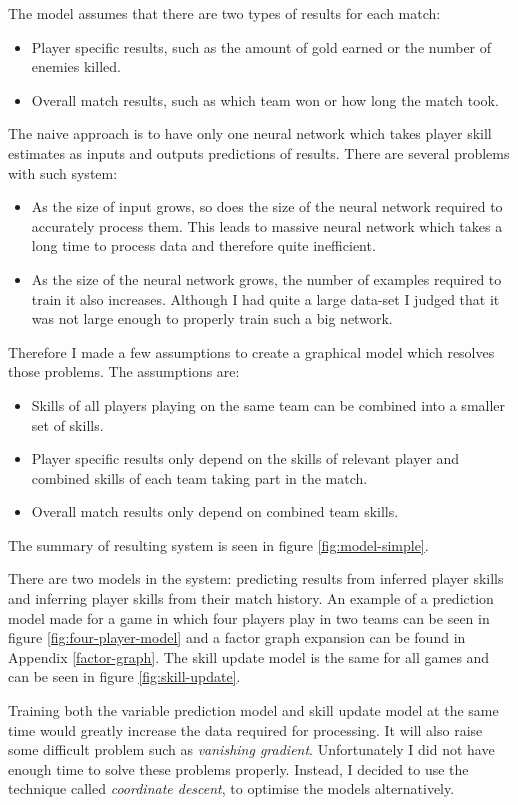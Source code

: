 \documentclass[12pt,a4paper]{book}
\begin{document}
The model assumes that there are two types of results for each match:
\begin{itemize}
\item Player specific results, such as the amount of gold earned or the number of enemies killed.
\item Overall match results, such as which team won or how long the match took.
\end{itemize}
The naive approach is to have only one neural network which takes player skill estimates as inputs and outputs predictions of results.
There are several problems with such system:
\begin{itemize}
\item As the size of input grows, so does the size of the neural network required to accurately process them.
This leads to massive neural network which takes a long time to process data and therefore quite inefficient.
\item As the size of the neural network grows, the number of examples required to train it also increases.
Although I had quite a large data-set I judged that it was not large enough to properly train such a big network.
\end{itemize}
Therefore I made a few assumptions to create a graphical model which resolves those problems.
The assumptions are:
\begin{itemize}
\item Skills of all players playing on the same team can be combined into a smaller set of skills.
\item Player specific results only depend on the skills of relevant player and combined skills of each team taking part in the match.
\item Overall match results only depend on combined team skills.
\end{itemize}
The summary of resulting system is seen in figure \ref{fig:model-simple}.

There are two models in the system: predicting results from inferred player skills and inferring player skills from their match history.
An example of a prediction model made for a game in which four players play in two teams can be seen in figure \ref{fig:four-player-model} and a factor graph expansion can be found in Appendix \ref{factor-graph}.
The skill update model is the same for all games and can be seen in figure \ref{fig:skill-update}.

Training both the variable prediction model and skill update model at the same time would greatly increase the data required for processing.
It will also raise some difficult problem such as \emph{vanishing gradient}.
Unfortunately I did not have enough time to solve these problems properly.
Instead, I decided to use the technique called \emph{coordinate descent}, to optimise the models alternatively.
\end{document}
